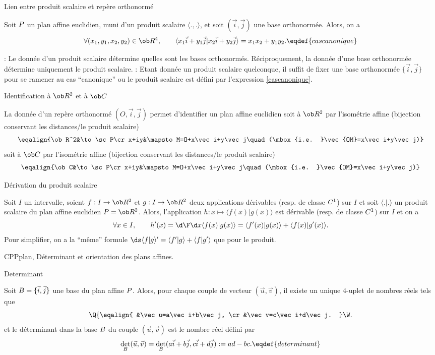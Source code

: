 \Concept [] Lien entre produit scalaire et rep\`ere orthonorm\'e

\Propriete []  Soit $\sc P$ un  plan  affine  euclidien,  muni  d'un produit scalaire $\langle.,.\rangle$, 
et soit $(\vec i,\vec j)$ une base orthonorm\'ee.  Alors, on a 
$$
\forall  (x_1,y_1,x_2,y_2)\in\ob  R^4,\qquad  \langle   x_1\vec   i+y_1\vec   j|x_2\vec   i+y_2\vec   j\rangle=x_1x_2+y_1y_2.
\eqdef{cascanonique} 
$$

 : Le donn\'ee d'un produit scalaire d\'etermine quelles sont les bases orthonorm\'es. R\'eciproquement, 
la donn\'ee d'une base orthonorm\'ee d\'etermine uniquement le produit scalaire. 
\bigskip
{} : Etant donn\'ee un produit scalaire quelconque, il suffit de fixer une base orthonorm\'ee $\{\vec i,\vec j\}$ 
pour se ramener au cas ``canonique'' ou le produit scalaire est d\'efini par l'expression \eqref{cascanonique}. 
\bigskip


\Concept [] Identification \`a $\ob R^2$ et \`a $\ob C$ 

\noindent
La donn\'ee d'un rep\`ere orthonorm\'e $(O,\vec i,\vec j)$ permet d'identifier un plan affine euclidien soit \`a $\ob R^2$ par l'isom\'etrie affine (bijection conservant les distances/le produit scalaire)
$$
\eqalign{\ob R^2&\to \sc P\cr x+iy&\mapsto M=O+x\vec i+y\vec j\quad(\mbox{i.e. }\vec{OM}=x\vec i+y\vec j)}
$$
soit \`a $\ob C$ par l'isom\'etrie affine (bijection conservant les distances/le produit scalaire)
$$
\eqalign{\ob C&\to\sc P\cr x+iy&\mapsto M=O+x\vec i+y\vec j\quad(\mbox{i.e. }\vec{OM}=x\vec i+y\vec j)}
$$

\Concept [] D\'erivation du produit scalaire

\noindent
Soit $I$ un intervalle, soient $f:I\to\ob R^2$ et $g:I\to\ob R^2$ deux applications d\'erivables (resp. de classe $\sc C^1$) sur $I$ et soit $\langle.|.\rangle$ un produit scalaire du plan affine euclidien $\sc P=\ob R^2$. Alors, l'application $h:x\mapsto \langle f(x)|g(x)\rangle$ est d\'erivable (resp. de classe $\sc C^1$) sur $I$ et on a 
$$
\forall x\in I,\qquad {h'(x)={\d\F\d x} \langle f(x)|g(x)\rangle= \langle f'(x)|g(x)\rangle+ \langle f(x)|g'(x)\rangle}.
$$
Pour simplifier, on a la ``m\^eme'' formule $\ds\langle f|g\rangle'= \langle f'|g\rangle+ \langle f|g'\rangle$ que pour le produit. 


\Section CPPplan, D\'eterminant et orientation des plans affines.

\Concept [] Determinant

Soit $\sc B=\{\vec i,\vec j\}$ une base du plan affine $\sc P$. 
Alors, pour chaque couple de vecteur $(\vec u,\vec v)$, il existe un unique $4$-uplet de nombres r\'eels tels que 
$$
\Q\{
\eqalign{
&\vec u=a\vec i+b\vec j,
\cr
&\vec v=c\vec i+d\vec j.
}
\W.
$$
et le d\'eterminant dans la base $\sc B$ du couple $(\vec u,\vec v)$ est le nombre r\'eel d\'efini par 
$$
{\det_{\sc B}(\vec u,\vec v)=\det_{\sc B}(a\vec i+b\vec j,c\vec i+d\vec j):=ad-bc}.\eqdef{determinant}
$$

